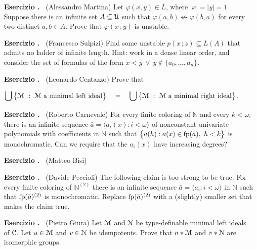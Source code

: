 \documentclass[10pt]{article}
\def\phi{\varphi}
\def\M{\EuScript M}
\def\N{\EuScript N}
\def\C{\EuScript C}
\def\U{\EuScript U}
\def\niff{\nleftrightarrow}
\def\NN{\mathds N}
\newcounter{ex}
\newenvironment{exercise}{\bigskip\addtocounter{ex}{1}\textbf{Esercizio \theex.\ }}{}
\begin{document}
\begin{exercise}
  (Alessandro Martina)
  Let $\phi(x,y)\in  L$, where $|x|=|y|=1$.
  Suppose there is an infinite set $A\subseteq\U$ such that $\phi(a,b)\niff\phi(b,a)$ for every two distinct $a,b\in A$.
  Prove that $\phi(x\,;y)$ is unstable.
\end{exercise}

\begin{exercise} 
  (Francesco Sulpizi)
  Find some unstable $p(x\,;z)\subseteq L(A)$ that admits no ladder of infinite length.
  Hint: work in a dense linear order, and consider the set of formulas of the form $x<y\ \vee\  y\notin\{a_0,\dots,a_n\}$.
\end{exercise}

\begin{exercise}
  (Leonardo Centazzo)
  Prove that

 \hfil$\displaystyle\bigcup\big\{\M\ :\ \M\text{ a minimal left ideal}\big\}\quad  =\quad\bigcup\big\{\M\ :\ \M\text{ a minimal right ideal}\big\}$.

\end{exercise}

\begin{exercise}
  (Roberto Carnevale)
  For every finite coloring of $\NN$ and every $k<\omega$, 
  there is an infinite sequence $\bar a=\langle a_i(x):i<\omega\rangle$ of nonconstant univariate polynomials with coefficients in $\NN$ such that $\big\{a(h): a(x)\in{\rm fp}(\bar a),\ h<k\big\}$ is monochromatic.
  Can we require that the $a_i(x)$ have increasing degrees?
\end{exercise}

\begin{exercise}
  (Matteo Bisi)
\end{exercise}

\begin{exercise}
  (Davide Peccioli)
  The following claim is too strong to be true.
  For every finite coloring of $\NN^{(2)}$ there is an infinite sequence $\bar a=\langle a_i:i<\omega\rangle$ in $\NN$ such that ${\rm fp}(\bar a)^{(2)}$ is monochromatic.
  Replace ${\rm fp}(\bar a)^{(2)}$ with a (slightly) smaller set that makes the claim true.
\end{exercise}

\begin{exercise}
  (Pietro Giura)
  Let $\M$ and $\N$ be type-definable minimal left ideals of $\C$.
  Let $u\in\M$ and $v\in\N$ be idempotents.
  Prove that $u*\M$ and $v*\N$ are isomorphic groups.
\end{exercise}
\end{document}
